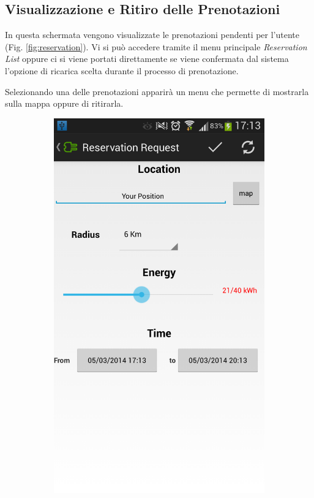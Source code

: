 \subsection{Visualizzazione e Ritiro delle Prenotazioni}

In questa schermata vengono visualizzate le prenotazioni pendenti per l'utente (Fig. \ref{fig:reservation}). Vi si può accedere tramite il menu principale \emph{Reservation List} oppure ci si viene portati direttamente se viene confermata dal sistema l'opzione di ricarica scelta durante il processo di prenotazione. 

Selezionando una delle prenotazioni apparirà un menu che permette di mostrarla sulla mappa oppure di ritirarla.

\begin{figure}
	\centering
	\begin{subfigure}{0.45\textwidth}
		\includegraphics[width=\textwidth]{assets/mobile-app-charge-request.png}

\end{subfigure}
\end{figure}
